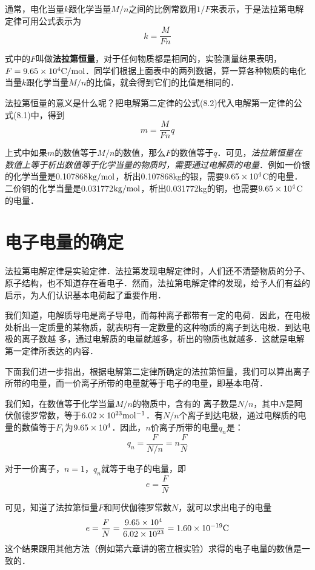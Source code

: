 通常，电化当量$k$跟化学当量$M/n$之间的比例常数用$1/F$来表示，于是法拉第电解定律可用公式表示为
\begin{equation}
    k=\frac{M}{Fn}
\end{equation}

式中的$F$叫做\textbf{法拉第恒量}，对于任何物质都是相同的，实验测量结果表明，$F=9.65\times10^4{\rm C}/{\rm mol}$．同学们根据上面表中的两列数据，算一算各种物质的电化当量$k$跟化学当量$M/n$的比值，就会得到它们的比值是相同的．

法拉第恒量的意义是什么呢？把电解第二定律的公式(8.2)代入电解第一定律的公式(8.1)中，得到
\begin{equation}
    m=\frac{M}{Fn}q
\end{equation}

上式中如果$m$的数值等于$M/n$的数值，那么$F$的数值等于$q$．可见，\textit{法拉第恒量在数值上等于析出数值等于化学当量的物质时，需要通过电解质的电量}．例如一价银的化学当量是0.107868${\rm kg}/{\rm mol}$，析出0.107868kg的银，需要$9.65\times10^4$C的电量．二价铜的化学当量是0.031772${\rm kg}/{\rm mol}$，析出0.031772kg的铜，也需要$9.65\times10^4$C的电量．

\section{电子电量的确定}
法拉第电解定律是实验定律．法拉第发现电解定律时，人们还不清楚物质的分子、原子结构，也不知道存在着电子．然而，法拉第电解定律的发现，给予人们有益的启示，为人们认识基本电荷起了重要作用．

我们知道，电解质导电是离子导电，而每种离子都带有一定的电荷．因此，在电极处析出一定质量的某物质，就表明有一定数量的这种物质的离子到达电极．到达电极的离子数越
多，通过电解质的电量就越多，析出的物质也就越多．这就是电解第一定律所表达的内容．

下面我们进一步指出，根据电解第二定律所确定的法拉第恒量，我们可以算出离子所带的电量，而一价离子所带的电量就等于电子的电量，即基本电荷．

我们知，在数值等于化学当量$M/n$的物质中，含有的
离子数是$N/n$，其中$N$是阿伏伽德罗常数，等于$6.02\times10^{23}{\rm mol^{-1}}$．有$N/n$个离子到达电极，通过电解质的电量的数值等于$F_1$为$9.65\times10^4$．因此，$n$价离子所带的电量$q_n$是：
\[q_n=\frac{F}{N/n}=n\frac{F}{N} \]

对于一价离子，$n=1$，$q_n$就等于电子的电量，即
\[e=\frac{F}{N}\]

可见，知道了法拉第恒量$F$和阿伏伽德罗常数$N$，就可以求出电子的电量 
\[e=\frac{F}{N}=\frac{9.65\times10^4}{6.02\times10^{23}}=1.60\times 10^{-19}{\rm C}\]
这个结果跟用其他方法（例如第六章讲的密立根实验）求得的电子电量的数值是一致的．

